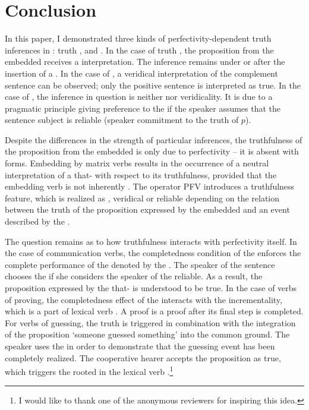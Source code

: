 \documentclass[output=paper,  modfonts,  newtxmath,  hidelinks		  ]{langscibook}
\begin{document}
\section{Conclusion}
In this paper, I demonstrated three kinds of perfectivity-dependent truth inferences in : truth ,  and . In the case of truth , the proposition from the embedded  receives a  interpretation. The inference remains under  or after the insertion of a . In the case of , a veridical interpretation of the complement sentence can be observed; only the positive sentence is interpreted as true. In the case of , the inference in question is neither  nor veridicality. It is due to a pragmatic principle giving preference to the  if the speaker assumes that the sentence subject is reliable (speaker commitment to the truth of $p$).

Despite the differences in the strength of particular inferences, the truthfulness of the proposition from the embedded  is only due to perfectivity – it is absent with  forms. Embedding by  matrix verbs results in the occurrence of a neutral interpretation of a that- with respect to its truthfulness, provided that the embedding  verb is not inherently . The  operator PFV introduces a truthfulness feature, which is realized as , veridical or reliable depending on the relation between the truth of the proposition expressed by the embedded  and an event described by the .

The question remains as to how truthfulness interacts with perfectivity itself. In the case of communication verbs, the completedness condition of the  enforces the complete performance of the  denoted by the . The speaker of the sentence chooses the  if she considers the speaker of the  reliable. As a result, the proposition expressed by the that- is understood to be true. In the case of verbs of proving, the completedness effect of the  interacts with the incrementality, which is a part of lexical verb . A proof is a proof after its final step is completed. For verbs of guessing, the truth  is triggered in combination with the integration of the proposition `someone guessed something' into the common ground. The speaker uses the  in order to demonstrate that the guessing event has been completely realized. The cooperative hearer accepts the proposition as true, which triggers the  rooted in the lexical verb .\footnote{I would like to thank one of the anonymous reviewers for inspiring this idea.}
\end{document}
